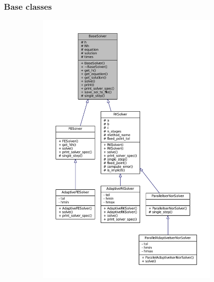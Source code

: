 \documentclass{beamer}
\begin{document}
\begin{frame} %
	\frametitle{Base classes}
	\begin{figure}
		\begin{subfigure}{.5\textwidth}
			\begin{center}
				\includegraphics[width=0.5 \linewidth]{etc/classes_full.pdf} %
			\end{center}
		\end{subfigure}%
		\begin{subfigure}{.5\textwidth}

\end{subfigure}
\end{figure}
\end{frame}
\end{document}
